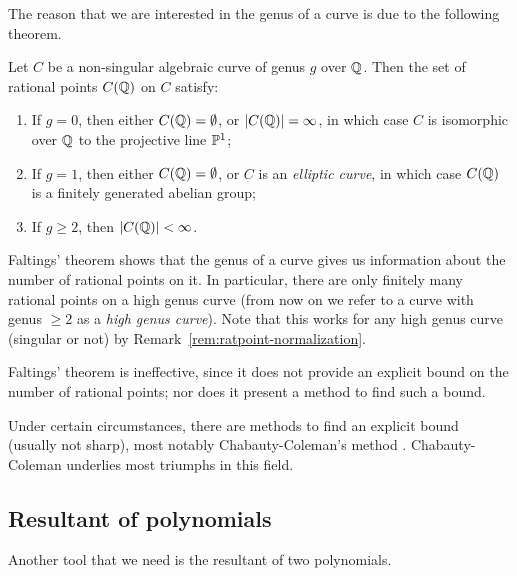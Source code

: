 The reason that we are interested in the genus of a curve is due to
the following theorem.

\begin{theorem}
  Let $C$ be a non-singular algebraic curve of genus $g$ over
  $\Q$. Then the set of rational points $C(\Q)$ on $C$ satisfy:
  \begin{enumerate}
  \item If $g = 0$, then either $C(\Q) = \es$, or $|C(\Q)| = \infty$,
    in which case $C$ is isomorphic over $\Q$ to the projective line
    $\P^1$;

  \item If $g = 1$, then either $C(\Q) = \es$, or $C$ is an
    \emph{elliptic curve}, in which case $C(\Q)$ is a finitely
    generated abelian group;

  \item If $g \ge 2$, then $|C(\Q)| < \infty$.
  \end{enumerate}
\end{theorem}

Faltings' theorem shows that the genus of a curve gives us information
about the number of rational points on it. In particular, there are
only finitely many rational points on a high genus curve (from now on
we refer to a curve with genus $\ge 2$ as a \emph{high genus
  curve}). Note that this works for any high genus curve (singular or
not) by Remark~\ref{rem:ratpoint-normalization}.

\begin{remark}
  Faltings' theorem is ineffective, since it does not provide an
  explicit bound on the number of rational points; nor does it present
  a method to find such a bound.

  Under certain circumstances, there are methods to find an explicit
  bound (usually not sharp), most notably Chabauty-Coleman's method
  \cite{MR808103}. Chabauty-Coleman underlies most triumphs in this
  field.
\end{remark}

\subsection{Resultant of polynomials}

Another tool that we need is the resultant of two polynomials.

